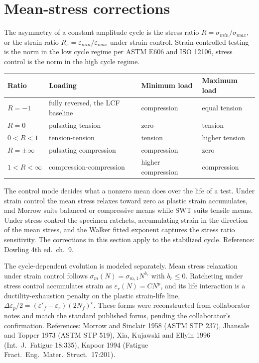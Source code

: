 \documentclass[11pt]{article}
\begin{document}
\section{Mean-stress corrections}
The asymmetry of a constant amplitude cycle is the stress ratio
\(R = \sigma_{min}/\sigma_{max}\), or the strain ratio
\(R_\varepsilon = \varepsilon_{min}/\varepsilon_{max}\) under strain control.
Strain-controlled testing is the norm in the low cycle regime per ASTM E606
and ISO 12106, stress control is the norm in the high cycle regime.

\begin{table}[h]
\centering
\small
\begin{tabular}{llll}
\toprule
Ratio & Loading & Minimum load & Maximum load \\
\midrule
\(R = -1\) & fully reversed, the LCF baseline & compression & equal tension \\
\(R = 0\) & pulsating tension & zero & tension \\
\(0 < R < 1\) & tension-tension & tension & higher tension \\
\(R = \pm\infty\) & pulsating compression & compression & zero \\
\(1 < R < \infty\) & compression-compression & higher compression & compression \\
\bottomrule
\end{tabular}
\end{table}

The control mode decides what a nonzero mean does over the life of a test.
Under strain control the mean stress relaxes toward zero as plastic strain
accumulates, and Morrow suits balanced or compressive means while SWT suits
tensile means. Under stress control the specimen ratchets, accumulating
strain in the direction of the mean stress, and the Walker fitted exponent
captures the stress ratio sensitivity. The corrections in this section apply
to the stabilized cycle. Reference: Dowling 4th ed.\ ch.~9.

The cycle-dependent evolution is modeled separately. Mean stress relaxation
under strain control follows \(\sigma_m(N) = \sigma_{m,1} N^{b_r}\) with
\(b_r \le 0\). Ratcheting under stress control accumulates strain as
\(\varepsilon_r(N) = C N^{p}\), and its life interaction is a
ductility-exhaustion penalty on the plastic strain-life line,
\(\Delta\varepsilon_p/2 = (\varepsilon'_f - \varepsilon_r)(2N_f)^{c}\). These
forms were reconstructed from collaborator notes and match the standard
published forms, pending the collaborator's confirmation. References: Morrow
and Sinclair 1958 (ASTM STP 237), Jhansale and Topper 1973 (ASTM STP 519),
Xia, Kujawski and Ellyin 1996 (Int.\ J.\ Fatigue 18:335), Kapoor 1994
(Fatigue Fract.\ Eng.\ Mater.\ Struct.\ 17:201).
\end{document}
